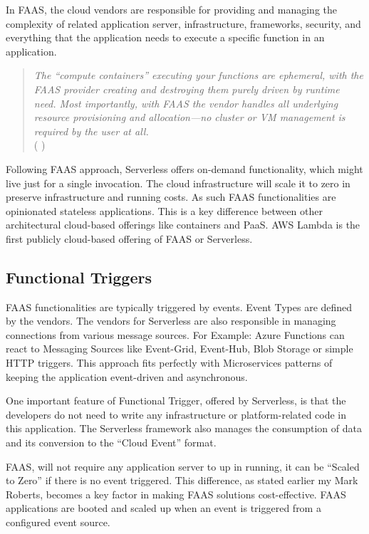 \documentclass{article}
\begin{document}
\par
\begin{flushleft}
In \gls{FAAS}, the cloud vendors are responsible for providing and managing the complexity of related application server, infrastructure, frameworks, security, and everything that the application needs to execute a specific function in an application. 

\begin{quote}
\textit{
The “compute containers” executing your functions are ephemeral, with the \gls{FAAS} provider creating and destroying them purely driven by runtime need. Most importantly, with \gls{FAAS} the vendor handles all underlying resource provisioning and allocation—no cluster or VM management is required by the user at all.}\\ ( \cite{Roberts_Mike_2018} )
\end{quote}

Following \gls{FAAS} approach, Serverless offers on-demand functionality, which might live just for a single invocation. The cloud infrastructure will scale it to zero in preserve infrastructure and running costs. As such \gls{FAAS} functionalities are opinionated stateless applications. This is a key difference between other architectural cloud-based offerings like containers and PaaS. 
 \gls{AWS} Lambda is the first publicly cloud-based offering of \gls{FAAS} or Serverless. 

\subsection{Functional Triggers}
\gls{FAAS} functionalities are typically triggered by events. Event Types are defined by the vendors. The vendors for Serverless are also responsible in managing connections from various message sources. For Example:  Azure Functions can react to Messaging Sources like Event-Grid, Event-Hub, Blob Storage or simple \gls{HTTP} triggers. This approach fits perfectly with Microservices patterns of keeping the application event-driven and asynchronous.

One important feature of Functional Trigger, offered by Serverless, is that the developers do not need to write any infrastructure or platform-related code in this application. The Serverless framework also manages the consumption of data and its conversion to the “Cloud Event” format.

\gls{FAAS}, will not require any application server to up in running, it can be “Scaled to Zero” if there is no event triggered. This difference, as stated earlier my Mark Roberts, becomes a key factor in making \gls{FAAS} solutions cost-effective. \gls{FAAS} applications are booted and scaled up when an event is triggered from a configured event source.


\end{flushleft}
\end{document}
